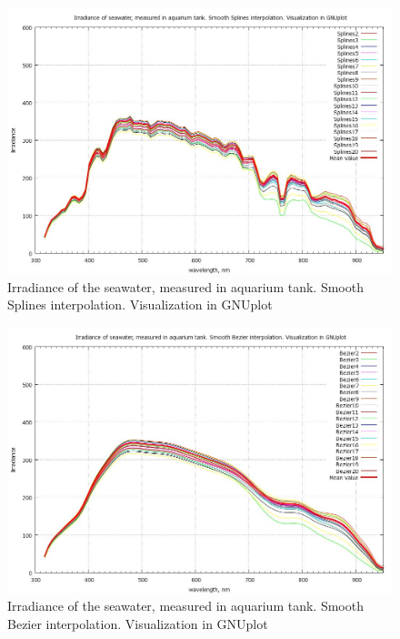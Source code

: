 \documentclass[10pt, a4paper]{article}
\begin{document}
\begin{appendices}
\begin{figure}[h]
\begin{center}
\includegraphics[scale=0.25]{GNU-Irr-Splines.jpg}
\caption{Irradiance of the seawater, measured in aquarium tank. Smooth Splines interpolation. Visualization in GNUplot­}
\label{fig:48}
\end{center}
\end{figure}
\begin{figure}[H]
\centering
\includegraphics[scale=0.25]{GNU-Irr.jpg}
\caption{Irradiance of the seawater, measured in aquarium tank. Smooth Bezier interpolation. Visualization in GNUplot}
\label{fig:49}
\end{figure}
\pagebreak
\newpage


\end{appendices}
\end{document}
